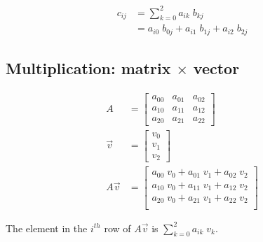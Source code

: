 \documentclass[twoside]{article}
\begin{document}
\begin{align*}
  c_{ij} & = \sum_{k = 0}^2 a_{ik} \; b_{kj} \\
        & = a_{i0} \; b_{0j} + a_{i1} \; b_{1j} + a_{i2} \; b_{2j}
  \end{align*}


\subsection{Multiplication: matrix $\times$ vector}

\begin{align*}
  A & = \left[ \begin{array}{rrr}
    a_{00} & a_{01} & a_{02} \\
    a_{10} & a_{11} & a_{12} \\
    a_{20} & a_{21} & a_{22} 
    \end{array} \right] \\
  \vec{v} & = \left[ \begin{array}{r}
    v_0 \\
    v_1 \\
    v_2
    \end{array} \right] \\
  A \vec{v} & = \left[ \begin{array}{r}
    a_{00} \; v_0 + a_{01} \; v_1 + a_{02} \; v_2 \\
    a_{10} \; v_0 + a_{11} \; v_1 + a_{12} \; v_2 \\
    a_{20} \; v_0 + a_{21} \; v_1 + a_{22} \; v_2 \\
    \end{array} \right]
  \end{align*}

The element in the $i^{th}$ row 
of $A \vec{v}$ is $\sum_{k = 0}^2 a_{ik} \; v_k$.
\end{document}
